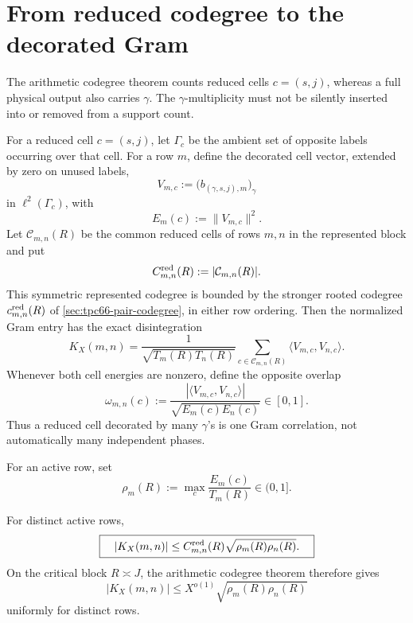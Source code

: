 \section{From reduced codegree to the decorated Gram}

The arithmetic codegree theorem counts reduced cells \(c=(s,j)\), whereas a
full physical output also carries \(\gamma\). The \(\gamma\)-multiplicity
must not be silently inserted into or removed from a support count.

For a reduced cell \(c=(s,j)\), let \(\Gamma_c\) be the ambient set of
opposite labels occurring over that cell. For a row \(m\), define the
decorated cell vector, extended by zero on unused labels,
\[
 V_{m,c}:=
 \bigl(b_{(\gamma,s,j),m}\bigr)_\gamma
\]
in \(\ell^2(\Gamma_c)\), with
\[
 E_m(c):=\|V_{m,c}\|^2.
\]
Let \(\mathcal C_{m,n}(R)\) be the common reduced cells of rows \(m,n\)
in the represented block and put
\[
 C_{m,n}^{\rm red}(R):=|\mathcal C_{m,n}(R)|.
\]
This symmetric represented codegree is bounded by the stronger rooted
codegree \(c_{m,n}^{\rm red}(R)\) of
\cref{sec:tpc66-pair-codegree}, in either row ordering.
Then the normalized Gram entry has the exact disintegration
\begin{equation}\label{eq:tpc66-decorated-gram}
 K_X(m,n)
 =
 \frac{1}{\sqrt{T_m(R)T_n(R)}}
 \sum_{c\in\mathcal C_{m,n}(R)}
 \langle V_{m,c},V_{n,c}\rangle.
\end{equation}
Whenever both cell energies are nonzero, define the opposite overlap
\begin{equation}\label{eq:tpc66-opposite-overlap}
 \omega_{m,n}(c)
 :=
 \frac{|\langle V_{m,c},V_{n,c}\rangle|}
 {\sqrt{E_m(c)E_n(c)}}\in[0,1].
\end{equation}
Thus a reduced cell decorated by many \(\gamma\)'s is one Gram correlation,
not automatically many independent phases.

\begin{definition}
For an active row, set
\begin{equation}\label{eq:tpc66-diffuseness}
 \rho_m(R):=\max_c\frac{E_m(c)}{T_m(R)}\in(0,1].
\end{equation}
\end{definition}

\begin{proposition}
\label{prop:tpc66-codegree-diffuseness}
For distinct active rows,
\begin{equation}\label{eq:tpc66-pair-gram-bound}
 \boxed{\quad
 |K_X(m,n)|
 \le C_{m,n}^{\rm red}(R)
 \sqrt{\rho_m(R)\rho_n(R)}.
 \quad}
\end{equation}
On the critical block \(R\asymp J\), the arithmetic codegree theorem therefore
gives
\begin{equation}\label{eq:tpc66-critical-pair-bound}
 |K_X(m,n)|
 \le X^{o(1)}\sqrt{\rho_m(R)\rho_n(R)}
\end{equation}
uniformly for distinct rows.
\end{proposition}

